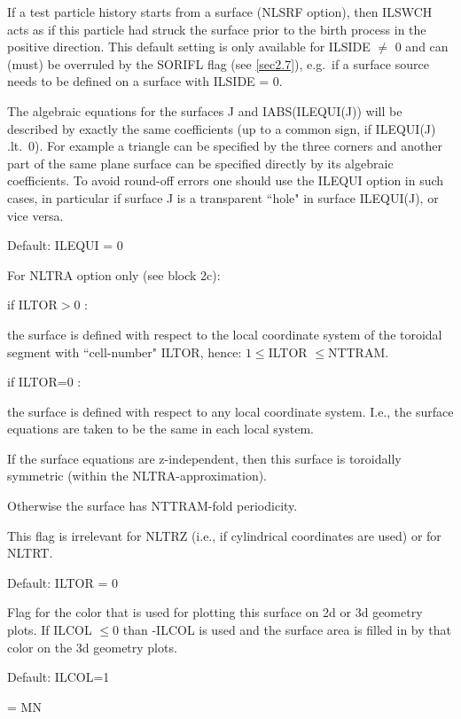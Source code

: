\begin{description}
        If a test particle history starts from a surface (NLSRF option), then ILSWCH
        acts as if this particle had struck the surface prior to the birth process in
        the positive direction.
        This default setting is only available for ILSIDE $\neq$ 0 and can (must) be
        overruled by the SORIFL flag (see \cref{sec2.7}), e.g.\ if a surface source
        needs to be defined on a surface with ILSIDE = 0.
  \item[ILEQUI] The algebraic equations for the surfaces J and IABS(ILEQUI(J))
        will be described by exactly the same coefficients (up to a common sign, if
        ILEQUI(J) .lt.\ 0).
        For example a triangle can be specified by the three corners and another part
        of the same plane surface can be specified directly by its algebraic
        coefficients.
        To avoid round-off errors one should use the ILEQUI option in such cases, in
        particular if surface J is a transparent ``hole" in surface ILEQUI(J), or vice
        versa.

        Default: ILEQUI = 0
  \item[ILTOR] For NLTRA option only (see block 2c):

        if ILTOR$>$0 :

        the surface is defined with respect to the local coordinate system
        of the toroidal segment with ``cell-number" ILTOR, hence: $1 \le
        $ILTOR $\le $NTTRAM.

        if ILTOR=0 :

        the surface is defined with respect to any local coordinate system.
        I.e., the surface equations are taken to be the same in each local system.

        If the surface equations are z-independent, then this surface is toroidally
        symmetric (within the NLTRA-approximation).

        Otherwise the surface has NTTRAM-fold periodicity.

        This flag is irrelevant for NLTRZ (i.e., if cylindrical coordinates are used)
        or for NLTRT.

        Default: ILTOR = 0
  \item[ILCOL] Flag for the color that is used for plotting
        this surface on 2d or 3d geometry plots.
        If ILCOL $\le 0$  than -ILCOL is used and the surface area is filled in by that
        color on the 3d geometry plots.

        Default: ILCOL=1
  \item[ILFIT] = MN 


\end{description}
